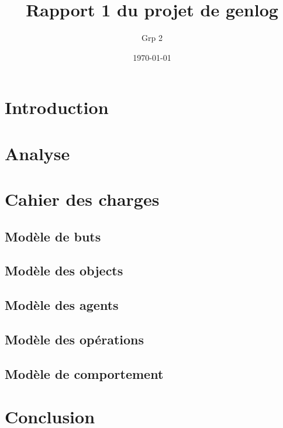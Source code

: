 \documentclass[12pt,openany]{book}
\title{Rapport 1 du projet de genlog}
\author{Grp 2}
\date{\today}
\begin{document}
\setlength{\parskip}{1em}

\maketitle

\chapter*{Introduction}
	

\chapter{Analyse}
	

\chapter{Cahier des charges}
	\section{Modèle de buts}
		

	\section{Modèle des objects}
		

	\section{Modèle des agents}
		

	\section{Modèle des opérations}
		

	\section{Modèle de comportement}
		

\chapter*{Conclusion}
	
\end{document}
